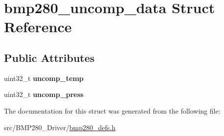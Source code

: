 \hypertarget{structbmp280__uncomp__data}{}\section{bmp280\+\_\+uncomp\+\_\+data Struct Reference}
\label{structbmp280__uncomp__data}
\subsection*{Public Attributes}
\begin{DoxyCompactItemize}
\item 
\mbox{\label{structbmp280__uncomp__data_a2869029e138833b126ecc7d83bca2545}} 
uint32\+\_\+t {\bfseries uncomp\+\_\+temp}
\item 
\mbox{\label{structbmp280__uncomp__data_afc708059780662041007d678bdeb78e3}} 
uint32\+\_\+t {\bfseries uncomp\+\_\+press}
\end{DoxyCompactItemize}


The documentation for this struct was generated from the following file\+:\begin{DoxyCompactItemize}
\item 
src/\+B\+M\+P280\+\_\+\+Driver/\mbox{\hyperlink{bmp280__defs_8h}{bmp280\+\_\+defs.\+h}}\end{DoxyCompactItemize}
